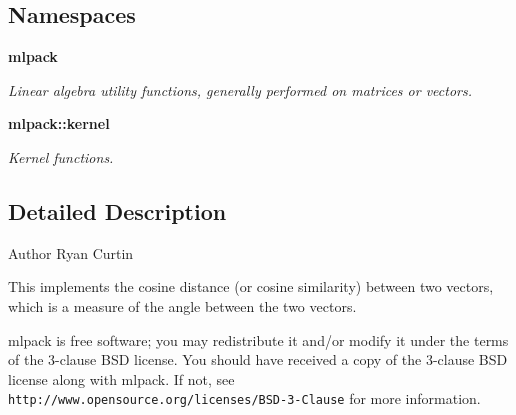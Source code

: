 \subsection*{Namespaces}
\begin{DoxyCompactItemize}
\item 
 {\bf mlpack}
\begin{DoxyCompactList}\small\item\em Linear algebra utility functions, generally performed on matrices or vectors. \end{DoxyCompactList}\item 
 {\bf mlpack\+::kernel}
\begin{DoxyCompactList}\small\item\em Kernel functions. \end{DoxyCompactList}\end{DoxyCompactItemize}


\subsection{Detailed Description}
\begin{DoxyAuthor}{Author}
Ryan Curtin
\end{DoxyAuthor}
This implements the cosine distance (or cosine similarity) between two vectors, which is a measure of the angle between the two vectors.

mlpack is free software; you may redistribute it and/or modify it under the terms of the 3-\/clause B\+SD license. You should have received a copy of the 3-\/clause B\+SD license along with mlpack. If not, see {\tt http\+://www.\+opensource.\+org/licenses/\+B\+S\+D-\/3-\/\+Clause} for more information. 